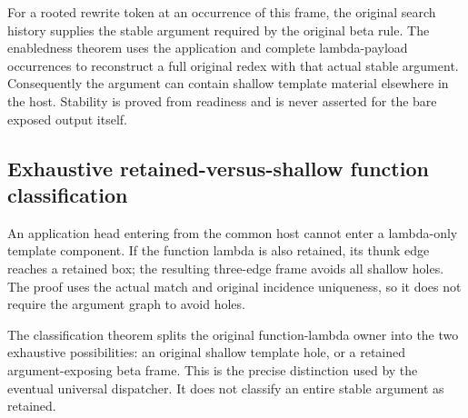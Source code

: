For a rooted rewrite token at an occurrence of this frame, the original search history supplies the stable argument required by the original beta rule. The enabledness theorem uses the application and complete lambda-payload occurrences to reconstruct a full original redex with that actual stable argument. Consequently the argument can contain shallow template material elsewhere in the host. Stability is proved from readiness and is never asserted for the bare exposed output itself.
\par{}
\par{}
\par{}

\subsection{Exhaustive retained-versus-shallow function classification}
An application head entering from the common host cannot enter a lambda-only template component. If the function lambda is also retained, its thunk edge reaches a retained box; the resulting three-edge frame avoids all shallow holes. The proof uses the actual match and original incidence uniqueness, so it does not require the argument graph to avoid holes.

The classification theorem splits the original function-lambda owner into the two exhaustive possibilities: an original shallow template hole, or a retained argument-exposing beta frame. This is the precise distinction used by the eventual universal dispatcher. It does not classify an entire stable argument as retained.
\par{}

